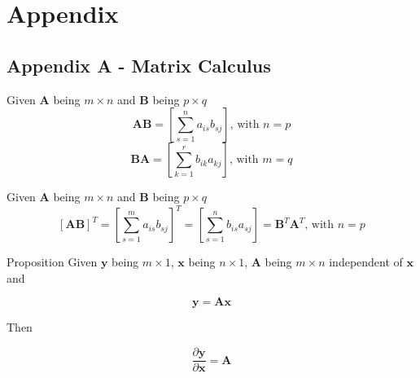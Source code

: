 \section{Appendix}\label{sec:appendix}
\framecard{\insertsection}
\subsection{Appendix A - Matrix Calculus}

\begin{frame}{\insertsubsection}

\begin{definition}
Given $\mathbf{A}$ being $m \times n$ and $\mathbf{B}$ being $p \times q$
\begin{equation*}
\mathbf{A}\mathbf{B} = \left[ \sum^n_{s=1} a_{is}b_{sj} \right] \text{, with } n = p 
\end{equation*}
\begin{equation*}
\mathbf{B}\mathbf{A} = \left[ \sum^r_{k=1} b_{ik}a_{kj} \right] \text{, with } m = q
\end{equation*}
\end{definition}

\end{frame}

\begin{frame}{\insertsubsection}

\begin{definition}
Given $\mathbf{A}$ being $m \times n$ and $\mathbf{B}$ being $p \times q$
\begin{equation*}
\left[ \mathbf{A}\mathbf{B} \right]^T = \left[ \sum^m_{s=1} a_{is}b_{sj} \right]^T  = \left[ \sum^n_{s=1} b_{is}a_{sj} \right] = \mathbf{B}^T \mathbf{A}^T \text{, with } n = p
\end{equation*}
\end{definition}

\end{frame}


\begin{frame}{\insertsubsection}

\begin{block}{Proposition}
Given $\mathbf{y}$ being $m \times 1$, $\mathbf{x}$ being $n \times 1$, $\mathbf{A}$ being $m \times n$ independent of $\mathbf{x}$ and

\begin{equation*}
\mathbf{y} = \mathbf{A} \mathbf{x}
\end{equation*}

Then

\begin{equation*}
\frac{\partial \mathbf{y}}{\partial \mathbf{x}} = \mathbf{A}
\end{equation*}

\end{block}

\end{frame}

